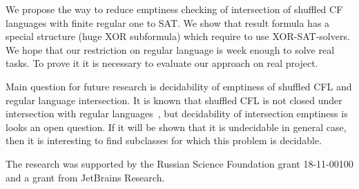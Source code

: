We propose the way to reduce emptiness checking of intersection of shuffled CF languages with finite regular one to SAT.
We show that result formula has a special structure (huge XOR subformula) which require to use XOR-SAT-solvers.
We hope that our restriction on regular language is week enough to solve real tasks.
To prove it it is necessary to evaluate our approach on real project.

Main question for future research is decidability of emptiness of shuffled CFL and regular language intersection.
It is known that shuffled CFL is not closed under intersection with regular languages~\cite{CFLShuffle}, but decidability of intersection emptiness is looks an open question.
If it will be shown that it is undecidable in general case, then it is interesting to find subclasses for which this problem is decidable.



\begin{acks}
The research was supported by the Russian Science Foundation grant 18-11-00100 and a grant from JetBrains Research.   
\end{acks}
